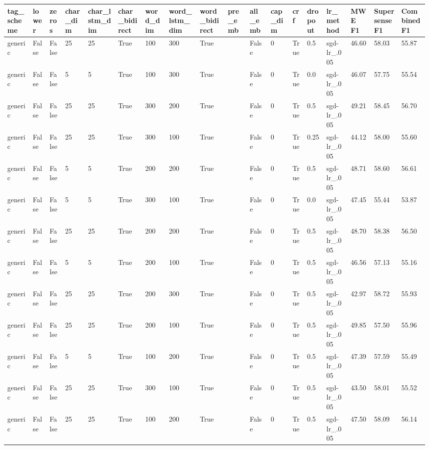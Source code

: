 \begin{adjustbox}{rotate=90,height=\textheight,width=\textwidth}\label{tab:all602020optimisationtests}
\tiny
\begin{tabular}{llllllllllllllllll}
tag\_scheme & lower & zeros & char\_dim & char\_lstm\_dim & char\_bidirect & word\_dim & word\_lstm\_dim & word\_bidirect & pre\_emb & all\_emb & cap\_dim & crf & dropout & lr\_method & MWE F1 &  Supersense F1 &  Combined F1\\
\hline
generic & False & False & 25 & 25 & True & 100 & 300 & True &  & False & 0 & True & 0.5 & sgd-lr\_.005 & 46.60 & 58.03 & 55.87\\
generic & False & False & 5 & 5 & True & 100 & 300 & True &  & False & 0 & True & 0.0 & sgd-lr\_.005 & 46.07 & 57.75 & 55.54\\
generic & False & False & 25 & 25 & True & 300 & 200 & True &  & False & 0 & True & 0.5 & sgd-lr\_.005 & 49.21 & 58.45 & 56.70\\
generic & False & False & 25 & 25 & True & 300 & 100 & True &  & False & 0 & True & 0.25 & sgd-lr\_.005 & 44.12 & 58.00 & 55.60\\
generic & False & False & 5 & 5 & True & 200 & 200 & True &  & False & 0 & True & 0.5 & sgd-lr\_.005 & 48.71 & 58.60 & 56.61\\
generic & False & False & 5 & 5 & True & 300 & 100 & True &  & False & 0 & True & 0.0 & sgd-lr\_.005 & 47.45 & 55.44 & 53.87\\
generic & False & False & 25 & 25 & True & 200 & 200 & True &  & False & 0 & True & 0.5 & sgd-lr\_.005 & 48.70 & 58.38 & 56.50\\
generic & False & False & 5 & 5 & True & 200 & 100 & True &  & False & 0 & True & 0.5 & sgd-lr\_.005 & 46.56 & 57.13 & 55.16\\
generic & False & False & 25 & 25 & True & 200 & 300 & True &  & False & 0 & True & 0.5 & sgd-lr\_.005 & 42.97 & 58.72 & 55.93\\
generic & False & False & 25 & 25 & True & 200 & 100 & True &  & False & 0 & True & 0.5 & sgd-lr\_.005 & 49.85 & 57.50 & 55.96\\
generic & False & False & 5 & 5 & True & 100 & 200 & True &  & False & 0 & True & 0.5 & sgd-lr\_.005 & 47.39 & 57.59 & 55.49\\
generic & False & False & 25 & 25 & True & 300 & 100 & True &  & False & 0 & True & 0.5 & sgd-lr\_.005 & 43.50 & 58.01 & 55.52\\
generic & False & False & 25 & 25 & True & 100 & 200 & True &  & False & 0 & True & 0.5 & sgd-lr\_.005 & 47.50 & 58.09 & 56.14\\

\end{tabular}
\end{adjustbox}
